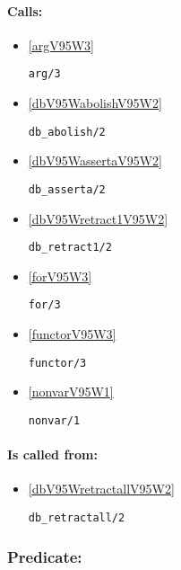 \paragraph{Calls:} 
\begin{itemize}
\item \ref{argV95W3} 
\begin{verbatim}
arg/3
\end{verbatim}

\item \ref{dbV95WabolishV95W2} 
\begin{verbatim}
db_abolish/2
\end{verbatim}

\item \ref{dbV95WassertaV95W2} 
\begin{verbatim}
db_asserta/2
\end{verbatim}

\item \ref{dbV95Wretract1V95W2} 
\begin{verbatim}
db_retract1/2
\end{verbatim}

\item \ref{forV95W3} 
\begin{verbatim}
for/3
\end{verbatim}

\item \ref{functorV95W3} 
\begin{verbatim}
functor/3
\end{verbatim}

\item \ref{nonvarV95W1} 
\begin{verbatim}
nonvar/1
\end{verbatim}

\end{itemize}
\paragraph{Is called from:} 
\begin{itemize}
\item \ref{dbV95WretractallV95W2} 
\begin{verbatim}
db_retractall/2
\end{verbatim}

\end{itemize}

\subsubsection{Predicate:} \label{dbV95WsaveV95W1}

